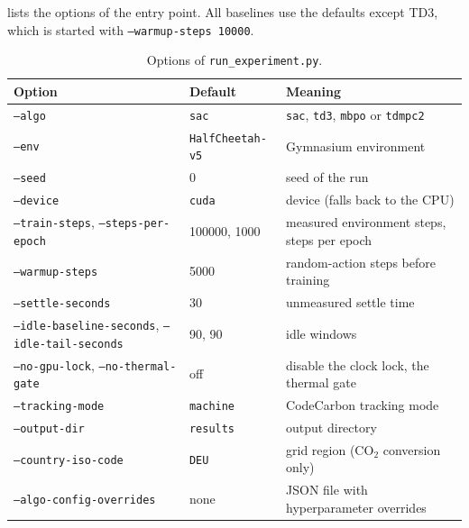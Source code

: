 lists the options of the entry point.
All baselines use the defaults except TD3, which is started with \texttt{--warmup-steps 10000}.

\begin{table}[tbp]
  \centering
  \footnotesize
  \caption{Options of \texttt{run\_experiment.py}.}
  \label{tab:app-repro-cli}
  \begin{tabular}{@{}lll@{}}
    \toprule
    Option                                                          & Default            & Meaning                                                 \\
    \midrule
    \texttt{--algo}                                                 & \texttt{sac}       & \texttt{sac}, \texttt{td3}, \texttt{mbpo} or \texttt{tdmpc2} \\
    \texttt{--env}                                                  & \texttt{HalfCheetah-v5} & Gymnasium environment                              \\
    \texttt{--seed}                                                 & \num{0}            & seed of the run                                         \\
    \texttt{--device}                                               & \texttt{cuda}      & device (falls back to the CPU)                          \\
    \texttt{--train-steps}, \texttt{--steps-per-epoch}              & \num{100000}, \num{1000} & measured environment steps, steps per epoch       \\
    \texttt{--warmup-steps}                                         & \num{5000}         & random-action steps before training                     \\
    \texttt{--settle-seconds}                                       & \num{30}           & unmeasured settle time                                  \\
    \texttt{--idle-baseline-seconds}, \texttt{--idle-tail-seconds}  & \num{90}, \num{90} & idle windows                                            \\
    \texttt{--no-gpu-lock}, \texttt{--no-thermal-gate}              & off                & disable the clock lock, the thermal gate                \\
    \texttt{--tracking-mode}                                        & \texttt{machine}   & CodeCarbon tracking mode                                \\
    \texttt{--output-dir}                                           & \texttt{results}   & output directory                                        \\
    \texttt{--country-iso-code}                                     & \texttt{DEU}       & grid region (CO$_2$ conversion only)                    \\
    \texttt{--algo-config-overrides}                                & none               & JSON file with hyperparameter overrides                 \\
    \bottomrule
  \end{tabular}
\end{table}

